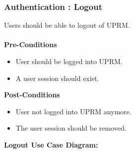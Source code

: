 \subsubsection{Authentication : Logout}
Users should be able to logout of UPRM.\\ \\
\textbf{Pre-Conditions}
\begin{itemize}
	\item User should be logged into UPRM.
	\item A user session should exist.\\
\end{itemize}
\textbf{Post-Conditions}
\begin{itemize}
	\item User not logged into UPRM anymore.
	\item The user session should be removed.\\
\end{itemize}
\textbf{Logout Use Case Diagram:}\\
\centerline{}
